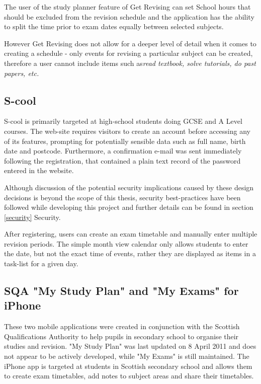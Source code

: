 \documentclass[bsc,frontabs,twoside,singlespacing,parskip]{infthesis}     %
\begin{document}
		The user of the study planner feature of Get Revising can set School hours that should be excluded from the revision schedule and the application has the ability to split the time prior to exam dates equally between selected subjects.

		However Get Revising does not allow for a deeper level of detail when it comes to creating a schedule - only events for revising a particular subject can be created, therefore a user cannot include items such as\textit{read textbook, solve tutorials, do past papers, etc.}

		\subsection{S-cool}
		S-cool is primarily targeted at high-school students doing GCSE and A Level courses. The web-site requires visitors to create an account before accessing any of its features, prompting for potentially sensible data such as full name, birth date and postcode. Furthermore, a confirmation e-mail was sent immediately following the registration, that contained a plain text record of the password entered in the website.

		Although discussion of the potential security implications caused by these design decisions is beyond the scope of this thesis, security best-practices have been followed while developing this project and further details can be found in section \ref{security} Security.

		After registering, users can create an exam timetable and manually enter multiple revision periods. The simple month view calendar only allows students to enter the date, but not the exact time of events, rather they are displayed as items in a task-list for a given day.

		\subsection{SQA "My Study Plan" and "My Exams" for iPhone}
		These two mobile applications were created in conjunction with the Scottish Qualifications Authority to help pupils in secondary school to organise their studies and revision. "My Study Plan" was last updated on 8 April 2011 and does not appear to be actively developed, while "My Exams" is still maintained. The iPhone app is targeted at students in Scottish secondary school and allows them to create exam timetables, add notes to subject areas and share their timetables.
\end{document}
